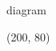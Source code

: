 \documentclass{article}
\begin{document}
	\begin{fmffile}{diagram}

	\begin{fmfgraph*}(200, 80)


























\end{fmfgraph*}
\end{fmffile}
\end{document}
